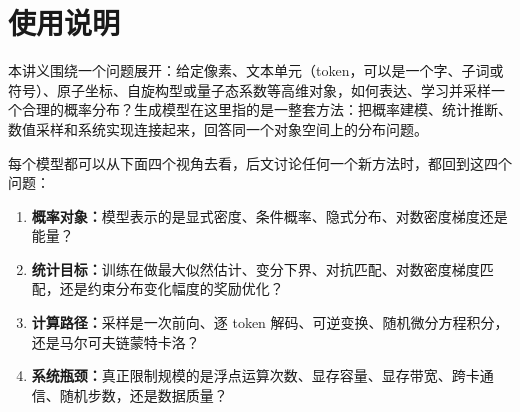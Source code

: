 \chapter*{使用说明}
本讲义围绕一个问题展开：给定像素、文本单元（token，可以是一个字、子词或符号）、原子坐标、自旋构型或量子态系数等高维对象，如何表达、学习并采样一个合理的概率分布？生成模型在这里指的是一整套方法：把概率建模、统计推断、数值采样和系统实现连接起来，回答同一个对象空间上的分布问题。

\begin{keybox}[本讲义的四个视角]
每个模型都可以从下面四个视角去看，后文讨论任何一个新方法时，都回到这四个问题：
\begin{enumerate}
  \item \textbf{概率对象：}模型表示的是显式密度、条件概率、隐式分布、对数密度梯度还是能量？
  \item \textbf{统计目标：}训练在做最大似然估计、变分下界、对抗匹配、对数密度梯度匹配，还是约束分布变化幅度的奖励优化？
  \item \textbf{计算路径：}采样是一次前向、逐 token 解码、可逆变换、随机微分方程积分，还是马尔可夫链蒙特卡洛？
  \item \textbf{系统瓶颈：}真正限制规模的是浮点运算次数、显存容量、显存带宽、跨卡通信、随机步数，还是数据质量？
\end{enumerate}
\end{keybox}
